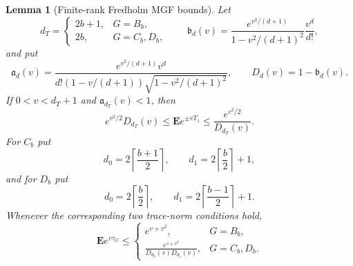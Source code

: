 \documentclass[11pt,reqno]{amsart}
\theoremstyle{plain}
\newtheorem{lemma}[theorem]{Lemma}
\theoremstyle{definition}
\begin{document}
\begin{lemma}[Finite-rank Fredholm MGF bounds]
\label{lem:finite-rank-fredholm-mgf}
Let
\[
 d_T=\begin{cases}2b+1,&G=B_b,\\2b,&G=C_b,D_b,
 \end{cases}
 \qquad
 \mathfrak b_d(v)=
 \frac{e^{v^2/(d+1)}}{1-v^2/(d+1)^2}\frac{v^d}{d!},
\]
and put
\[
 \mathfrak a_d(v)=
 \frac{e^{v^2/(d+1)}v^d}
 {d!(1-v/(d+1))\sqrt{1-v^2/(d+1)^2}},
 \qquad D_d(v)=1-\mathfrak b_d(v).
\]
If
$0<v<d_T+1$ and $\mathfrak a_{d_T}(v)<1$, then
\begin{equation}
\label{eq:finite-trace-mgf-sandwich}
 e^{v^2/2}D_{d_T}(v)
 \leq\mathbf E e^{\pm vT_1}
 \leq\frac{e^{v^2/2}}{D_{d_T}(v)}.
\end{equation}
For $C_b$ put
\[
 d_0=2\left\lceil\frac{b+1}{2}\right\rceil,
 \qquad d_1=2\left\lceil\frac b2\right\rceil+1,
\]
and for $D_b$ put
\[
 d_0=2\left\lceil\frac b2\right\rceil,
 \qquad d_1=2\left\lceil\frac{b-1}{2}\right\rceil+1.
\]
Whenever the corresponding two trace-norm conditions hold,
\begin{equation}
\label{eq:finite-square-mgf-upper}
 \mathbf E e^{v\tau_G}\leq
 \begin{cases}
 e^{v+v^2},&G=B_b,\\[2pt]
 \displaystyle\frac{e^{v+v^2}}{D_{d_0}(v)D_{d_1}(v)},
   &G=C_b,D_b.
 \end{cases}
\end{equation}
\end{lemma}
\end{document}
